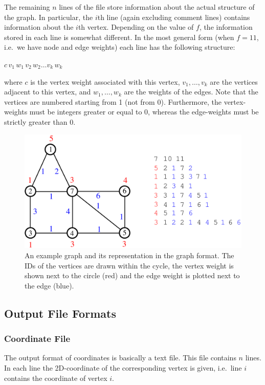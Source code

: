\documentclass[11pt]{article}
\newcommand{\ie}{i.e.\ }
\begin{document}
The remaining $n$ lines of the file store information about the actual structure of the graph. In particular, the $i$th line (again excluding comment lines) contains information about the $i$th vertex. Depending on the value of $f$, the information stored in each line is somewhat different. In the most general form (when $f=11$, \ie we have node and edge weights) each line has the following structure:
\begin{center}
       $c\, v_1\, w_1\, v_2\, w_2 \ldots v_k\, w_k$ 
\end{center}
where $c$ is the vertex weight associated with this vertex, $v_1, \ldots, v_k$ are the vertices adjacent to this vertex, and $w_1, \ldots, w_k$ are the weights of the edges. Note that the vertices are numbered starting from 1 (not from 0). Furthermore, the vertex-weights must be integers greater or equal to 0, whereas the edge-weights must be strictly greater than 0.

\begin{figure}[h!]
\begin{center}
\includegraphics[width=.8\textwidth]{example_graph.pdf}
\end{center}

\caption{An example graph and its representation in the graph format. The IDs of the vertices are drawn within the cycle, the vertex weight is shown next to the circle ({\color{red}red}) and the edge weight is plotted next to the edge ({\color{blue}blue}).}
\label{fig:example}
\end{figure}
\subsection{Output File Formats}
\subsubsection{Coordinate File}
The output format of coordinates is basically a text file. 
This file contains $n$ lines. 
In each line the 2D-coordinate of the corresponding vertex is given, \ie line $i$ contains the coordinate of vertex $i$.
\end{document}
